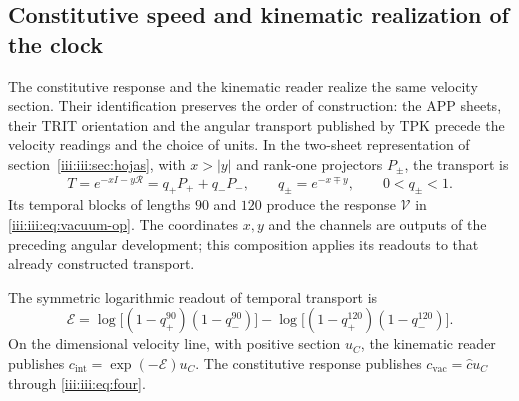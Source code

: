 \subsection{Constitutive speed and kinematic realization of the clock}
\label{iii:iii:sec:enlace-velocidad-constitutiva}

The constitutive response and the kinematic reader realize the same
velocity section. Their identification preserves the order of construction:
the APP sheets, their TRIT orientation and the angular transport published
by TPK precede the velocity readings and the choice of units.
In the two-sheet representation of
section~\ref{iii:iii:sec:hojas}, with $x>|y|$ and rank-one projectors
$P_\pm$, the transport is
\[
 T=e^{-xI-y\mathcal R}=q_+P_++q_-P_-,
 \qquad q_\pm=e^{-x\mp y},\qquad 0<q_\pm<1.
\]
Its temporal blocks of lengths $90$ and $120$ produce the response
$\mathcal V$ in \eqref{iii:iii:eq:vacuum-op}. The coordinates $x,y$ and the
channels are outputs of the preceding angular development; this composition
applies its readouts to that already constructed transport.

The symmetric logarithmic readout of temporal transport is
\begin{equation}
 \mathcal E=
 \log\!\bigl[(1-q_+^{90})(1-q_-^{90})\bigr]
 -\log\!\bigl[(1-q_+^{120})(1-q_-^{120})\bigr].
 \label{iii:iii:eq:velocidad-lector-simetrico}
\end{equation}
On the dimensional velocity line, with positive section $u_C$, the
kinematic reader publishes $c_{\mathrm{int}}=\exp(-\mathcal E)u_C$.
The constitutive response publishes
$c_{\mathrm{vac}}=\widehat c u_C$ through \eqref{iii:iii:eq:four}.

